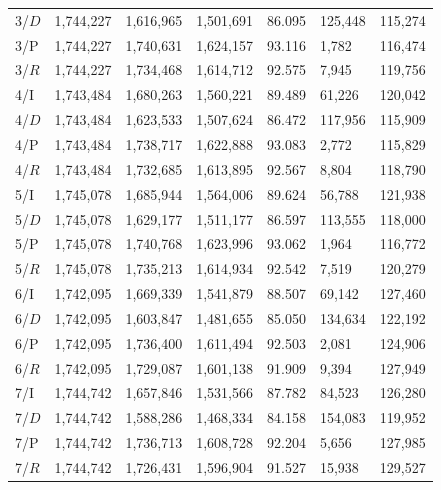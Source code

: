 \documentclass[11pt,a4paper]{article}
\begin{document}
\begin{xltabular}{\textwidth}{@{}YYYYYYY@{}}
3/$D$ & 1,744,227 & 1,616,965 & 1,501,691 & 86.095 & 125,448 & 115,274 \\
3/P & 1,744,227 & 1,740,631 & 1,624,157 & 93.116 & 1,782 & 116,474 \\
3/$R$ & 1,744,227 & 1,734,468 & 1,614,712 & 92.575 & 7,945 & 119,756 \\
4/I & 1,743,484 & 1,680,263 & 1,560,221 & 89.489 & 61,226 & 120,042 \\
4/$D$ & 1,743,484 & 1,623,533 & 1,507,624 & 86.472 & 117,956 & 115,909 \\
4/P & 1,743,484 & 1,738,717 & 1,622,888 & 93.083 & 2,772 & 115,829 \\
4/$R$ & 1,743,484 & 1,732,685 & 1,613,895 & 92.567 & 8,804 & 118,790 \\
5/I & 1,745,078 & 1,685,944 & 1,564,006 & 89.624 & 56,788 & 121,938 \\
5/$D$ & 1,745,078 & 1,629,177 & 1,511,177 & 86.597 & 113,555 & 118,000 \\
5/P & 1,745,078 & 1,740,768 & 1,623,996 & 93.062 & 1,964 & 116,772 \\
5/$R$ & 1,745,078 & 1,735,213 & 1,614,934 & 92.542 & 7,519 & 120,279 \\
6/I & 1,742,095 & 1,669,339 & 1,541,879 & 88.507 & 69,142 & 127,460 \\
6/$D$ & 1,742,095 & 1,603,847 & 1,481,655 & 85.050 & 134,634 & 122,192 \\
6/P & 1,742,095 & 1,736,400 & 1,611,494 & 92.503 & 2,081 & 124,906 \\
6/$R$ & 1,742,095 & 1,729,087 & 1,601,138 & 91.909 & 9,394 & 127,949 \\
7/I & 1,744,742 & 1,657,846 & 1,531,566 & 87.782 & 84,523 & 126,280 \\
7/$D$ & 1,744,742 & 1,588,286 & 1,468,334 & 84.158 & 154,083 & 119,952 \\
7/P & 1,744,742 & 1,736,713 & 1,608,728 & 92.204 & 5,656 & 127,985 \\
7/$R$ & 1,744,742 & 1,726,431 & 1,596,904 & 91.527 & 15,938 & 129,527 \\
\end{xltabular}
\endgroup
\end{document}
